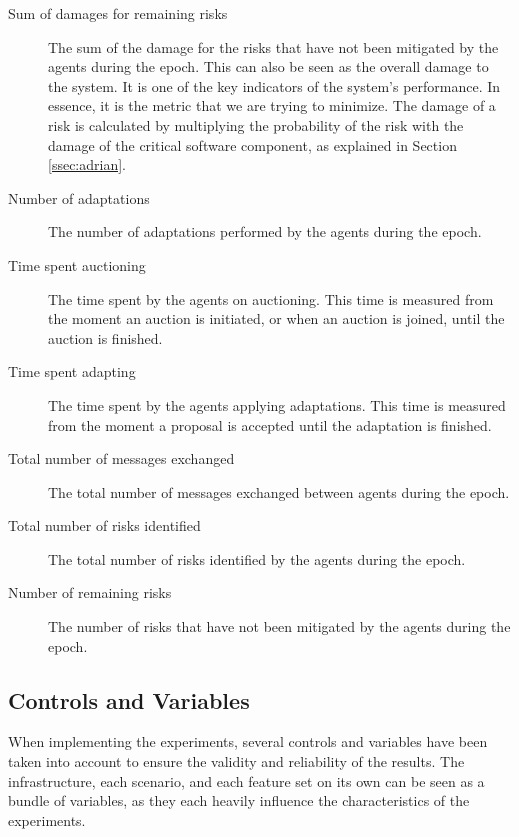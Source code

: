 \begin{description}
    \item[Sum of damages for remaining risks] The sum of the damage for the risks that have not been mitigated by the agents during the epoch. This can also be seen as the overall damage to the system. It is one of the key indicators of the system's performance. In essence, it is the metric that we are trying to minimize. The damage of a risk is calculated by multiplying the probability of the risk with the damage of the critical software component, as explained in Section \ref{ssec:adrian}. 
    \item[Number of adaptations] The number of adaptations performed by the agents during the epoch.
    \item[Time spent auctioning] The time spent by the agents on auctioning. This time is measured from the moment an auction is initiated, or when an auction is joined, until the auction is finished. 
    \item[Time spent adapting] The time spent by the agents applying adaptations. This time is measured from the moment a proposal is accepted until the adaptation is finished.
    \item[Total number of messages exchanged] The total number of messages exchanged between agents during the epoch.
    \item[Total number of risks identified] The total number of risks identified by the agents during the epoch.
    \item[Number of remaining risks] The number of risks that have not been mitigated by the agents during the epoch.
\end{description}

\subsection{Controls and Variables}
\label{ssec:controls-variables}

When implementing the experiments, several controls and variables have been taken into account to ensure the validity and reliability of the results. The infrastructure, each scenario, and each feature set on its own can be seen as a bundle of variables, as they each heavily influence the characteristics of the experiments. 

